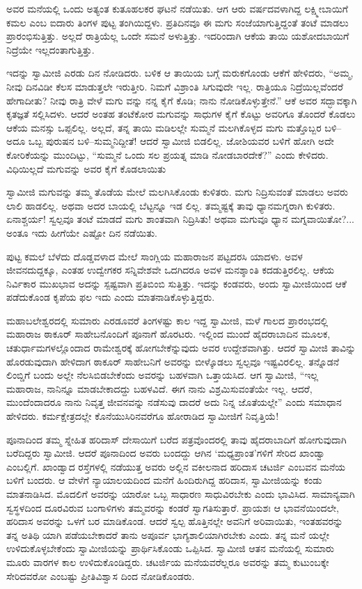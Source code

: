 ಅವರ ಮನೆಯಲ್ಲಿ ಒಂದು ಅತ್ಯಂತ ಕುತೂಹಲಕರ ಘಟನೆ ನಡೆಯಿತು. ಆಗ ಆರು ವರ್ಷದವಳಾಗಿದ್ದ ಲಕ್ಷ್ಮೀಬಾಯಿಗೆ ಕಮಲ ಎಂಬ ಐದಾರು ತಿಂಗಳ ಪುಟ್ಟ ತಂಗಿಯಿದ್ದಳು. ಪ್ರತಿದಿನವೂ ಈ ಮಗು ಸಂಜೆಯಾಗುತ್ತಿದ್ದಂತೆ ತಂಟೆ ಮಾಡಲು ಪ್ರಾರಂಭಿಸುತ್ತಿತ್ತು. ಅಲ್ಲದೆ ರಾತ್ರಿಯೆಲ್ಲ ಒಂದೇ ಸಮನೆ ಅಳುತ್ತಿತ್ತು. ಇದರಿಂದಾಗಿ ಆಕೆಯ ತಾಯಿ ಯಶೋದಬಾಯಿಗೆ ನಿದ್ರೆಯೇ ಇಲ್ಲದಂತಾಗುತ್ತಿತ್ತು.

ಇದನ್ನು ಸ್ವಾಮೀಜಿ ಎರಡು ದಿನ ನೋಡಿದರು. ಬಳಿಕ ಆ ತಾಯಿಯ ಬಗ್ಗೆ ಮರುಕಗೊಂಡು ಆಕೆಗೆ ಹೇಳಿದರು, “ಅಮ್ಮ, ನೀವು ದಿನವಿಡೀ ಕೆಲಸ ಮಾಡುತ್ತಲೇ ಇರುತ್ತೀರಿ. ನಿಮಗೆ ವಿಶ್ರಾಂತಿ ಸಿಗುವುದೇ ಇಲ್ಲ. ರಾತ್ರಿಯೂ ನಿದ್ರೆಯಿಲ್ಲವೆಂದರೆ ಹೇಗಾದೀತು? ನೀವು ರಾತ್ರಿ ವೇಳೆ ಮಗು ವನ್ನು ನನ್ನ ಕೈಗೆ ಕೊಡಿ; ನಾನು ನೋಡಿಕೊಳ್ಳುತ್ತೇನೆ.” ಆಕೆ ಅವರ ಸದ್ಭಾವಕ್ಕಾಗಿ ಕೃತಜ್ಞತೆ ಸಲ್ಲಿಸಿದಳು. ಆದರೆ ಅಂತಹ ತಂಟೆಕೋರ ಮಗುವನ್ನು ಸಾಧುಗಳ ಕೈಗೆ ಕೊಟ್ಟು ಅವರಿಗೂ ತೊಂದರೆ ಕೊಡಲು ಆಕೆಯ ಮನಸ್ಸು ಒಪ್ಪಲಿಲ್ಲ. ಅಲ್ಲದೆ, ತನ್ನ ತಾಯಿ ಮಡಿಲಲ್ಲೇ ಸುಮ್ಮನೆ ಮಲಗಿಕೊಳ್ಳದ ಮಗು ಮತ್ತೊಬ್ಬರ ಬಳಿ–ಅದೂ ಒಬ್ಬ ಪುರುಷನ ಬಳಿ–ಸುಮ್ಮನಿದ್ದೀತೆ! ಆದರೆ ಸ್ವಾಮೀಜಿ ಬಿಡಲಿಲ್ಲ. ಜೋಶಿಯವರ ಬಳಿಗೆ ಹೋಗಿ ಅದೇ ಕೋರಿಕೆಯನ್ನು ಮುಂದಿಟ್ಟು, “ಸುಮ್ಮನೆ ಒಂದು ಸಲ ಪ್ರಯತ್ನ ಮಾಡಿ ನೋಡಬಾರದೇಕೆ?” ಎಂದು ಕೇಳಿದರು. ವಿಧಿಯಿಲ್ಲದೆ ಮಗುವನ್ನು ಅವರ ಕೈಗೆ ಕೊಡಲಾಯಿತು

ಸ್ವಾಮೀಜಿ ಮಗುವನ್ನು ತಮ್ಮ ತೊಡೆಯ ಮೇಲೆ ಮಲಗಿಸಿಕೊಂಡು ಕುಳಿತರು. ಮಗು ನಿದ್ರಿಸುವಂತೆ ಮಾಡಲು ಅವರು ಲಾಲಿ ಹಾಡಲಿಲ್ಲ. ಅಥವಾ ಅದರ ಬಾಯಲ್ಲಿ ಬೆಟ್ಟನ್ನೂ ಇಡ ಲಿಲ್ಲ. ತಮ್ಮಷ್ಟಕ್ಕೆ ತಾವು ಧ್ಯಾನಮಗ್ನರಾಗಿ ಕುಳಿತರು. ಏನಾಶ್ಚರ್ಯ! ಸ್ವಲ್ಪವೂ ತಂಟೆ ಮಾಡದೆ ಮಗು ಶಾಂತವಾಗಿ ನಿದ್ರಿಸಿತು! ಅಥವಾ ಮಗುವೂ ಧ್ಯಾನ ಮಗ್ನವಾಯಿತೋ?... ಅಂತೂ ಇದು ಹೀಗೆಯೇ ಎಷ್ಟೋ ದಿನ ನಡೆಯಿತು.

ಪುಟ್ಟ ಕಮಲೆ ಬೆಳೆದು ದೊಡ್ಡವಳಾದ ಮೇಲೆ ಸಾಂಗ್ಲಿಯ ಮಹಾರಾಜನ ಪಟ್ಟದರಸಿ ಯಾದಳು. ಅವಳ ಜೀವನದುದ್ದಕ್ಕೂ, ಎಂತಹ ಉದ್ವೇಗಕರ ಸನ್ನಿವೇಶವೇ ಒದಗಿದರೂ ಅವಳ ಮನಶ್ಶಾಂತಿ ಕದಡುತ್ತಿರಲಿಲ್ಲ. ಆಕೆಯ ನಿರ್ವಿಕಾರ ಮುಖಭಾವ ಅದನ್ನು ಸ್ಪಷ್ಟವಾಗಿ ಪ್ರತಿಬಿಂಬಿ ಸುತ್ತಿತ್ತು. ಇದನ್ನು ಕಂಡವರು, ಅಂದು ಸ್ವಾಮೀಜಿಯಿಂದ ಆಕೆ ಪಡೆದುಕೊಂಡ ಕೃಪೆಯ ಫಲ ಇದು ಎಂದು ಮಾತನಾಡಿಕೊಳ್ಳುತ್ತಿದ್ದರು.

ಮಹಾಬಲೇಶ್ವರದಲ್ಲಿ ಸುಮಾರು ಎರಡೂವರೆ ತಿಂಗಳಷ್ಟು ಕಾಲ ಇದ್ದ ಸ್ವಾಮೀಜಿ, ಮಳೆ ಗಾಲದ ಪ್ರಾರಂಭದಲ್ಲಿ ಮಹಾರಾಜ ಠಾಕೂರ್ ಸಾಹೇಬನೊಂದಿಗೆ ಪೂನಾಗೆ ಹೊರಟರು. ಇಲ್ಲಿಂದ ಮುಂದೆ ಹೈದರಾಬಾದಿನ ಮೂಲಕ, ಚತುರ್ಧಾಮಗಳಲ್ಲೊಂದಾದ ರಾಮೇಶ್ವರಕ್ಕೆ ಹೋಗಬೇಕೆನ್ನುವುದು ಅವರ ಉದ್ದೇಶವಾಗಿತ್ತು. ಆದರೆ ಸ್ವಾಮೀಜಿ ತಾವಿನ್ನು ಹೊರಡುವುದಾಗಿ ಹೇಳಿದಾಗ ಠಾಕೂರ್ ಸಾಹೇಬನಿಗೆ ಅವರನ್ನು ಬೀಳ್ಕೊಡಲು ಸ್ವಲ್ಪವೂ ಇಷ್ಟವಿರಲಿಲ್ಲ. ತನ್ನೊಡನೆ ಲಿಂಬ್ಡಿಗೆ ಬಂದು ಅಲ್ಲೇ ನೆಲಸಿಬಿಡಬೇಕೆಂದು ಅವರನ್ನು ಬಹಳವಾಗಿ ಒತ್ತಾಯಸಿದ. ಆಗ ಸ್ವಾಮೀಜಿ, “ಇಲ್ಲ ಮಹಾರಾಜ, ನಾನಿನ್ನೂ ಮಾಡಬೇಕಾದದ್ದು ಬಹಳವಿದೆ. ಈಗ ನಾನು ವಿಶ್ರಮಿಸುವಂತೆಯೇ ಇಲ್ಲ. ಆದರೆ, ಮುಂದೆಂದಾದರೂ ನಾನು ನಿವೃತ್ತ ಜೀವನವನ್ನು ನಡೆಸುವು ದಾದರೆ ಅದು ನಿನ್ನ ಜೊತೆಯಲ್ಲೇ” ಎಂದು ಸಮಾಧಾನ ಹೇಳಿದರು. ಕರ್ಮಕ್ಷೇತ್ರದಲ್ಲೇ ಕೊನೆಯುಸಿರಿನವರೆಗೂ ಹೋರಾಡಿದ ಸ್ವಾಮೀಜಿಗೆ ನಿವೃತ್ತಿಯೆ!

ಪೂನಾದಿಂದ ತಮ್ಮ ಸ್ನೇಹಿತ ಹರಿದಾಸ್ ದೇಸಾಯಿಗೆ ಬರೆದ ಪತ್ರವೊಂದರಲ್ಲಿ ತಾವು ಹೈದರಾಬಾದಿಗೆ ಹೋಗುವುದಾಗಿ ಬರೆದಿದ್ದರು ಸ್ವಾಮೀಜಿ. ಆದರೆ ಪೂನಾದಿಂದ ಅವರು ಬಂದದ್ದು ಆಗಿನ ‘ಮಧ್ಯಪ್ರಾಂತ’ಗಳಿಗೆ ಸೇರಿದ ಖಾಂಡ್ವಾ ಎಂಬಲ್ಲಿಗೆ. ಖಾಂಡ್ವಾದ ರಸ್ತೆಗಳಲ್ಲಿ ನಡೆಯುತ್ತ ಅವರು ಅಲ್ಲಿನ ವಕೀಲನಾದ ಹರಿದಾಸ ಚಟರ್ಜಿ ಎಂಬವನ ಮನೆಯ ಬಳಿಗೆ ಬಂದರು. ಆ ವೇಳೆಗೆ ನ್ಯಾಯಾಲಯದಿಂದ ಮನೆಗೆ ಹಿಂದಿರುಗಿದ್ದ ಹರಿದಾಸ, ಸ್ವಾಮೀಜಿಯನ್ನು ಕಂಡು ಮಾತನಾಡಿಸಿದ. ಮೊದಲಿಗೆ ಅವರನ್ನು ಯಾರೋ ಒಬ್ಬ ಸಾಧಾರಣ ಸಾಧುವಿರಬೇಕು ಎಂದು ಭಾವಿಸಿದ. ಸಾಮಾನ್ಯವಾಗಿ ಸ್ವಸ್ಥಳದಿಂದ ದೂರವಿರುವ ಬಂಗಾಳಿಗಳು ತಮ್ಮವರನ್ನು ಕಂಡರೆ ಸ್ವಾಗತಿಸುತ್ತಾರೆ. ಪ್ರಾಯಶಃ ಆ ಭಾವನೆಯಿಂದಲೇ, ಹರಿದಾಸ ಅವರನ್ನು ಒಳಗೆ ಬರ ಮಾಡಿಕೊಂಡ. ಆದರೆ ಸ್ವಲ್ಪ ಹೊತ್ತಿನಲ್ಲೇ ಅವನಿಗೆ ಅರಿವಾಯಿತು, ಇಂತಹವರನ್ನು ತನ್ನ ಅತಿಥಿ ಯಾಗಿ ಪಡೆಯಬೇಕಾದರೆ ತಾನು ಅಪೂರ್ವ ಭಾಗ್ಯಶಾಲಿಯಾಗಿರಬೇಕು ಎಂದು. ತನ್ನ ಮನೆ ಯಲ್ಲೇ ಉಳಿದುಕೊಳ್ಳಬೇಕೆಂದು ಸ್ವಾಮೀಜಿಯನ್ನು ಪ್ರಾರ್ಥಿಸಿಕೊಂಡು ಒಪ್ಪಿಸಿದ. ಸ್ವಾಮೀಜಿ ಆತನ ಮನೆಯಲ್ಲಿ ಸುಮಾರು ಮೂರು ವಾರಗಳ ಕಾಲ ಉಳಿದುಕೊಂಡಿದ್ದರು. ಚಟರ್ಜಿಯ ಮನೆಯವರೆಲ್ಲರೂ ಅವರನ್ನು ತಮ್ಮ ಕುಟುಂಬಕ್ಕೇ ಸೇರಿದವರೋ ಎಂಬಷ್ಟು ಪ್ರೀತಿವಿಶ್ವಾಸ ದಿಂದ ನೋಡಿಕೊಂಡರು.

